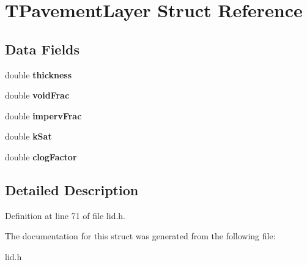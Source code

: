 \hypertarget{struct_t_pavement_layer}{}\section{T\+Pavement\+Layer Struct Reference}
\label{struct_t_pavement_layer}
\subsection*{Data Fields}
\begin{DoxyCompactItemize}
\item 
\mbox{\label{struct_t_pavement_layer_a20238819f2c84ce6d3f083ded9ac612d}} 
double {\bfseries thickness}
\item 
\mbox{\label{struct_t_pavement_layer_a7d25974d9e4546293ba18fee0f29620f}} 
double {\bfseries void\+Frac}
\item 
\mbox{\label{struct_t_pavement_layer_a495b5be39cd7fb61ce62ffd0b3745770}} 
double {\bfseries imperv\+Frac}
\item 
\mbox{\label{struct_t_pavement_layer_a8e493f06916cda5a3fc90418c0b6b3f6}} 
double {\bfseries k\+Sat}
\item 
\mbox{\label{struct_t_pavement_layer_abbad23abbcd30f0821d89dc3093879bb}} 
double {\bfseries clog\+Factor}
\end{DoxyCompactItemize}


\subsection{Detailed Description}


Definition at line 71 of file lid.\+h.



The documentation for this struct was generated from the following file\+:\begin{DoxyCompactItemize}
\item 
lid.\+h\end{DoxyCompactItemize}
